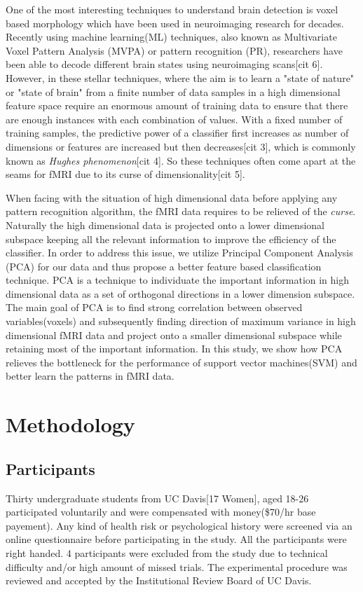 \documentclass[11pt]{article}
\begin{document}
One of the most interesting techniques to understand brain detection is voxel based morphology which have been used in neuroimaging research for decades. Recently using machine learning(ML) techniques, also known as Multivariate Voxel Pattern Analysis (MVPA) or pattern recognition (PR), researchers have been able to decode different brain states using neuroimaging scans[cit 6]. However, in these stellar techniques, where the aim is to learn a "state of nature" or "state of brain" from a finite number of data samples in a high dimensional feature space require an enormous amount of training data to ensure that there are enough instances with each combination of values. With a fixed number of training samples, the predictive power of a classifier first increases as number of dimensions or features are increased but then decreases[cit 3], which is commonly known as \textit{Hughes phenomenon}[cit 4]. So these techniques often come apart at the seams for fMRI due to its curse of dimensionality[cit 5]. 

When facing with the situation of high dimensional data before applying any pattern recognition algorithm, the fMRI data requires to be relieved of the \textit{curse}. Naturally the high dimensional data is projected onto a lower dimensional subspace keeping all the relevant information to improve the efficiency of the classifier. In order to address this issue, we utilize Principal Component Analysis (PCA) for our data and thus propose a better feature based classification technique. PCA is a technique to individuate the important information in high dimensional data as a set of orthogonal directions in a lower dimension subspace. The main goal of PCA is to find strong correlation between observed variables(voxels) and subsequently finding direction of maximum variance in high dimensional fMRI data and project onto a smaller dimensional subspace while retaining most of the important information. In this study, we show how PCA relieves the bottleneck for the performance of support vector machines(SVM) and better learn the patterns in fMRI data.

\section{Methodology}
\subsection{Participants}
Thirty undergraduate students from UC Davis[17 Women], aged 18-26 participated voluntarily and were compensated with money(\$70/hr base payement). Any kind of health risk or psychological history were screened via an online questionnaire before participating in the study. All the participants were right handed. 4 participants were excluded from the study due to technical difficulty and/or high amount of missed trials. The experimental procedure was reviewed and accepted by the Institutional Review Board of UC Davis.
\end{document}
